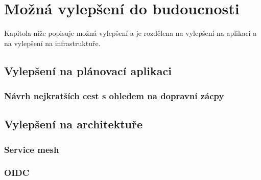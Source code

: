 \documentclass[thesis=M,czech]{FITthesis}[2019/12/23]
\theoremstyle{plain}
\theoremstyle{definition}
\begin{document}
\chapter{Možná vylepšení do budoucnosti}
Kapitola níže popisuje možná vylepšení a je rozdělena na vylepšení na aplikaci a na vylepšení na infrastruktuře.

\section{Vylepšení na plánovací aplikaci}

\subsection{Návrh nejkratších cest s ohledem na dopravní zácpy}




\section{Vylepšení na architektuře}



\subsection{Service mesh}


\subsection{OIDC}




\begin{conclusion}
\end{conclusion}


\end{document}
